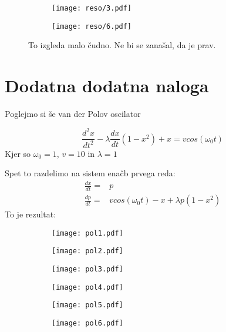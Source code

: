\documentclass{article}
\begin{document}
\begin{figure}[H]
\begin{subfigure}{.5\textwidth}
\texttt{[image: reso/3.pdf]}
\end{subfigure}
\begin{subfigure}{.5\textwidth}
\texttt{[image: reso/6.pdf]}
\end{subfigure}
\caption*{To izgleda malo čudno. Ne bi se zanašal, da je prav.}
\end{figure}



\section{Dodatna dodatna naloga}

Poglejmo si še van der Polov oscilator

\begin{equation*}
\frac{d^2x}{dt^2} - \lambda \frac{dx}{dt}(1-x^2) + x = v cos(\omega_0 t)
\end{equation*}
Kjer so $\omega_0 = 1$, $v=10$ in $\lambda = 1$

Spet to razdelimo na sistem enačb prvega reda:
\begin{align*}
\frac{dx}{dt} =& p \\
\frac{dp}{dt} =& v cos(\omega_0 t) - x + \lambda p (1-x^2)
\end{align*}
\newpage
To je rezultat:

\begin{figure}[H]
\begin{subfigure}{.3\textwidth}
\texttt{[image: pol1.pdf]}
\end{subfigure}
\begin{subfigure}{.3\textwidth}
\texttt{[image: pol2.pdf]}
\end{subfigure}
\begin{subfigure}{.3\textwidth}
\texttt{[image: pol3.pdf]}
\end{subfigure}
\end{figure}

\begin{figure}[H]
\begin{subfigure}{.3\textwidth}
\texttt{[image: pol4.pdf]}
\end{subfigure}
\begin{subfigure}{.3\textwidth}
\texttt{[image: pol5.pdf]}
\end{subfigure}
\begin{subfigure}{.3\textwidth}
\texttt{[image: pol6.pdf]}
\end{subfigure}
\end{figure}
\end{document}
